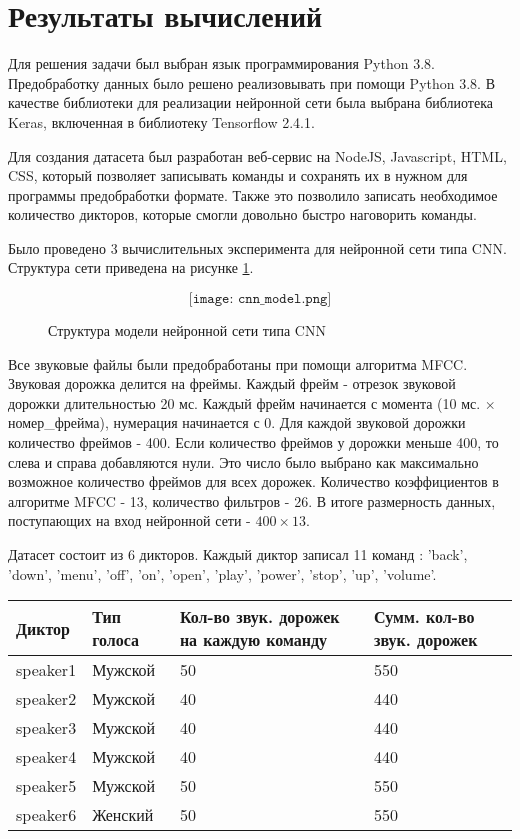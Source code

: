 \section{Результаты вычислений}
Для решения задачи был выбран язык программирования Python 3.8. Предобработку данных было решено реализовывать при помощи Python 3.8.
В качестве библиотеки для реализации нейронной сети была выбрана библиотека Keras, включенная в библиотеку Tensorflow 2.4.1.

Для создания датасета был разработан веб-сервис на NodeJS, Javascript, HTML, CSS, который позволяет записывать команды и сохранять их в нужном для программы предобработки формате. Также это позволило записать необходимое количество дикторов, которые смогли довольно быстро наговорить команды.


Было проведено 3 вычислительных эксперимента для нейронной сети типа CNN. Структура сети приведена на рисунке \ref{fig:cnn_model}.

\begin{figure}[H]
  \[\texttt{[image: cnn\_model.png]}\]
  \caption{Структура модели нейронной сети типа CNN}
  \label{fig:cnn_model}
\end{figure}

Все звуковые файлы были предобработаны при помощи алгоритма MFCC.
Звуковая дорожка делится на фреймы. Каждый фрейм - отрезок звуковой дорожки длительностью 20 мс. Каждый фрейм начинается с момента (10 мс. $\times$ номер\_фрейма), нумерация начинается с 0. Для каждой звуковой дорожки количество фреймов - 400. Если количество фреймов у дорожки меньше 400, то слева и справа добавляются нули. Это число было выбрано как максимально возможное количество фреймов для всех дорожек. Количество коэффициентов в алгоритме MFCC - 13, количество фильтров - 26. В итоге размерность данных, поступающих на вход нейронной сети - $400\times13$.

Датасет состоит из 6 дикторов. Каждый диктор записал 11 команд : 'back', 'down', 'menu', 'off', 'on', 'open', 'play', 'power', 'stop', 'up', 'volume'.
\\

\begin{tabular}[c]{ | p{2cm} | p{2cm} | p{6cm} | p{4cm} | }
\hline
Диктор & Тип голоса & Кол-во звук. дорожек на каждую команду & Сумм. кол-во звук. дорожек  \\ \hline
speaker1 & Мужской & 50 & 550 \\
speaker2 & Мужской & 40 & 440 \\
speaker3 & Мужской & 40 & 440 \\
speaker4 & Мужской & 40 & 440 \\
speaker5 & Мужской & 50 & 550 \\
speaker6 & Женский & 50 & 550 \\ \hline
\end{tabular}
\\

